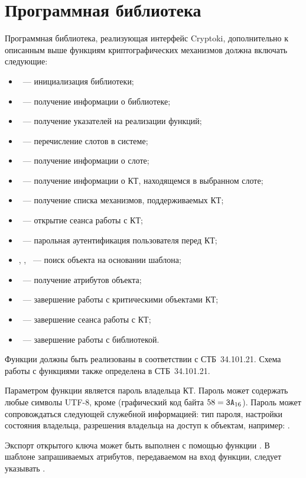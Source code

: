 \section{Программная библиотека}\label{CRYPTOKI.Lib}

Программная библиотека, реализующая интерфейс Cryptoki,
дополнительно к описанным выше функциям криптографических механизмов 
должна включать следующие:
\begin{itemize}
\item
{}~--- инициализация библиотеки;
\item
{}~--- получение информации о библиотеке;
\item
{}~--- получение указателей на реализации функций;
\item
{}~--- перечисление слотов в системе;
\item
{}~--- получение информации о слоте;
\item
{}~--- получение информации о КТ, находящемся в 
выбранном слоте;
\item
{}~--- 
получение списка механизмов, поддерживаемых КТ;
\item
{}~--- открытие сеанса работы с КТ;
\item
{}~--- парольная аутентификация пользователя перед КТ;
\item
{}, , ~--- 
поиск объекта на основании шаблона;
\item
{}~--- получение атрибутов объекта;
\item
{}~--- завершение работы с критическими объектами КТ;
\item
{}~--- завершение сеанса работы с КТ;
\item
{}~--- завершение работы с библиотекой.
\end{itemize}

Функции должны быть реализованы в соответствии с СТБ~34.101.21.
Схема работы с функциями также определена в СТБ~34.101.21.

Параметром функции  является пароль владельца КТ.
Пароль может содержать любые символы UTF-8, кроме \str{:} 
(графический код байта $58=\texttt{3A}_{16}$). Пароль может сопровождаться 
следующей служебной информацией: тип пароля, настройки состояния владельца, 
разрешения владельца на доступ к объектам, например: . 

Экспорт открытого ключа может быть выполнен с помощью функции 
. В шаблоне запрашиваемых атрибутов, 
передаваемом на вход функции, следует указывать .


